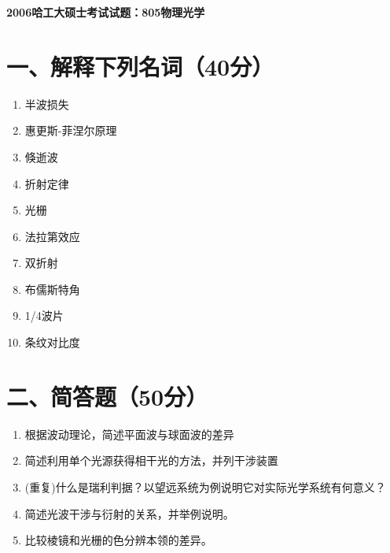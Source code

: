\documentclass[12pt, a4paper]{article}
\theoremstyle{solution}
\begin{document}
\begin{center}
\Large\textbf{2006哈工大硕士考试试题：805物理光学}
\end{center}




\section*{一、解释下列名词（40分）}
\begin{enumerate}
    \item 半波损失
    \item 惠更斯-菲涅尔原理
    \item 倏逝波
    \item 折射定律
    \item 光栅
    \item 法拉第效应
    \item 双折射
    \item 布儒斯特角
    \item 1/4波片
    \item 条纹对比度
\end{enumerate}
\section*{二、简答题（50分）}
\begin{enumerate}
    \item 根据波动理论，简述平面波与球面波的差异
    \item 简述利用单个光源获得相干光的方法，并列干涉装置
    \item (重复)什么是瑞利判据？以望远系统为例说明它对实际光学系统有何意义？
    \item 简述光波干涉与衍射的关系，并举例说明。
    \item 比较棱镜和光栅的色分辨本领的差异。
\end{enumerate}
\end{document}
